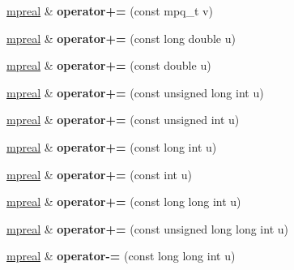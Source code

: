 \begin{DoxyCompactItemize}
\mbox{\label{classmpfr_1_1mpreal_a3ad00ab797af13b27ac97a6a913c2300}} 
\hyperlink{classmpfr_1_1mpreal}{mpreal} \& {\bfseries operator+=} (const mpq\+\_\+t v)
\item 
\mbox{\label{classmpfr_1_1mpreal_ace8e22533d35098614513b754a13f770}} 
\hyperlink{classmpfr_1_1mpreal}{mpreal} \& {\bfseries operator+=} (const long double u)
\item 
\mbox{\label{classmpfr_1_1mpreal_a0dca623e9956147770303ee15878fe34}} 
\hyperlink{classmpfr_1_1mpreal}{mpreal} \& {\bfseries operator+=} (const double u)
\item 
\mbox{\label{classmpfr_1_1mpreal_a567045ba2bf2fa0487998c485ea63d59}} 
\hyperlink{classmpfr_1_1mpreal}{mpreal} \& {\bfseries operator+=} (const unsigned long int u)
\item 
\mbox{\label{classmpfr_1_1mpreal_aa17b08d73f23daa92b5c9190b9dc047b}} 
\hyperlink{classmpfr_1_1mpreal}{mpreal} \& {\bfseries operator+=} (const unsigned int u)
\item 
\mbox{\label{classmpfr_1_1mpreal_a5e329f00abadaf2cce0c8f28e5752532}} 
\hyperlink{classmpfr_1_1mpreal}{mpreal} \& {\bfseries operator+=} (const long int u)
\item 
\mbox{\label{classmpfr_1_1mpreal_a221c5f8aa2f218defc4edc3c674e328b}} 
\hyperlink{classmpfr_1_1mpreal}{mpreal} \& {\bfseries operator+=} (const int u)
\item 
\mbox{\label{classmpfr_1_1mpreal_a938583fa36b2c14f19fe8ed4f4473381}} 
\hyperlink{classmpfr_1_1mpreal}{mpreal} \& {\bfseries operator+=} (const long long int u)
\item 
\mbox{\label{classmpfr_1_1mpreal_a3bc6222a7dc1ac6d4b052caccb31854f}} 
\hyperlink{classmpfr_1_1mpreal}{mpreal} \& {\bfseries operator+=} (const unsigned long long int u)
\item 
\mbox{\label{classmpfr_1_1mpreal_a8aafaacaea104a79fb62d8813226500f}} 
\hyperlink{classmpfr_1_1mpreal}{mpreal} \& {\bfseries operator-\/=} (const long long int u)

\end{DoxyCompactItemize}
